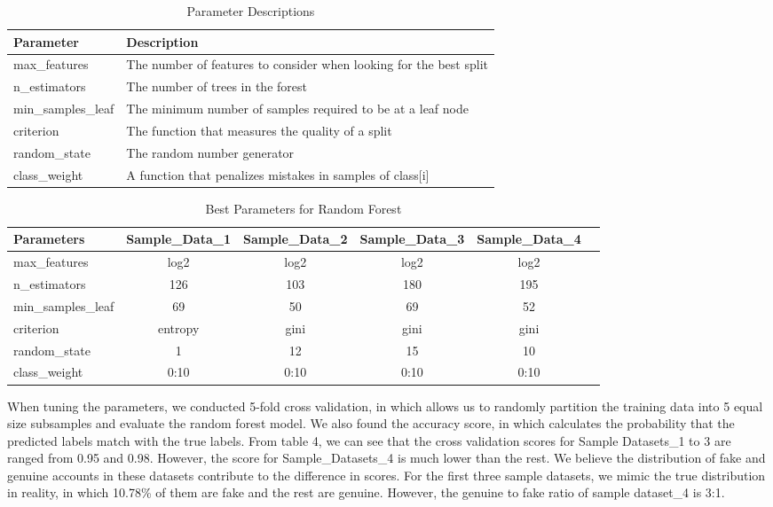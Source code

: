 \documentclass[a4paper, 12pt]{report}
\begin{document}
\begin{table}[h!]
	\caption{Parameter Descriptions}
	\begin{tabular}{ | l | p{12cm} |}
		\hline
		Parameter & Description  \\
		\hline
		max\_features & The number of features to consider when looking for the best split \\ 
		\hline
		n\_estimators & The number of trees in the forest \\ 
		\hline
		min\_samples\_leaf & The minimum number of samples required to be at a leaf node \\
		\hline
		criterion & The function that measures the quality of a split  \\
		\hline
		random\_state & The random number generator \\ 
		\hline
		class\_weight & A function that  penalizes mistakes in samples of class[i] \\ 
		\hline
	\end{tabular}
\end{table}

\begin{table}[h!]
	\caption{Best Parameters for Random Forest}
	\begin{tabular}{l*{4}{c}r}
		\hline
		Parameters     & Sample\_Data\_1 & Sample\_Data\_2 & Sample\_Data\_3 & Sample\_Data\_4 \\
		\hline
		max\_features & log2 & log2 & log2 & log2  \\
		n\_estimators & 126 & 103 & 180 & 195  \\
		min\_samples\_leaf & 69 & 50 & 69 & 52  \\
		criterion & entropy & gini & gini & gini  \\
		random\_state & 1 & 12 & 15 & 10  \\
		class\_weight & {0:10} & {0:10} & {0:10} & {0:10}  \\
		\hline
	\end{tabular}
\end{table}


\noindent When tuning the parameters, we conducted 5-fold cross validation, in which allows us to randomly partition the training data into 5 equal size subsamples and evaluate the random forest model. We also found the accuracy score, in which calculates the probability that the predicted labels match with the true labels. From table 4, we can see that the cross validation scores for Sample Datasets\_1 to 3 are ranged from 0.95 and 0.98. However, the score for Sample\_Datasets\_4 is much lower than the rest. We believe the distribution of fake and genuine accounts in these datasets contribute to the difference in scores. For the first three sample datasets, we mimic the true distribution in reality, in which 10.78\% of them are fake and the rest are genuine. However, the genuine to fake ratio of sample dataset\_4 is 3:1. \par
\end{document}
